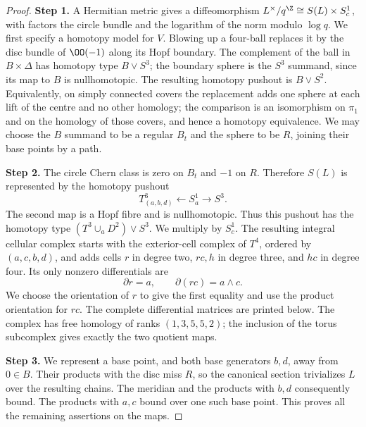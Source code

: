 \begin{proof}
\noindent\textbf{Step 1.} A Hermitian metric gives a diffeomorphism
$L^\times/q^\Z\cong S(L)\times S^1_c$, with factors the circle bundle and
the logarithm of the norm modulo $\log q$. We first specify a homotopy
model for $V$. Blowing up a four-ball replaces it by the disc bundle of
$\OO(-1)$ along its Hopf boundary. The complement of the ball in
$B\times\Delta$ has homotopy type $B\vee S^3$; the boundary sphere is
the $S^3$ summand, since its map to $B$ is nullhomotopic. The resulting
homotopy pushout is $B\vee S^2$. Equivalently, on simply connected
covers the replacement adds one sphere at each lift of the centre and
no other homology; the comparison is an isomorphism on $\pi_1$ and on
the homology of those covers, and hence a homotopy equivalence. We may
choose the $B$ summand to be a regular $B_t$ and the sphere to be $R$,
joining their base points by a path.

\noindent\textbf{Step 2.} The circle Chern class is zero on $B_t$ and $-1$ on $R$. Therefore
$S(L)$ is represented by the homotopy pushout
\[
 T^3_{(a,b,d)}\longleftarrow S^1_a\longrightarrow S^3.
\]
The second map is a Hopf fibre and is nullhomotopic. Thus this pushout
has the homotopy type $(T^3\cup_aD^2)\vee S^3$. We multiply by $S^1_c$.
The resulting integral cellular complex starts with the exterior-cell
complex of $T^4$, ordered by $(a,c,b,d)$, and adds cells $r$ in degree
two, $rc,h$ in degree three, and $hc$ in degree four. Its only nonzero
differentials are
\[
 \partial r=a,\qquad \partial(rc)=a\wedge c.
\]
We choose the orientation of $r$ to give the first equality and use the
product orientation for $rc$. The complete differential matrices are
printed below. The complex has free homology of ranks $(1,3,5,5,2)$;
the inclusion of the torus subcomplex gives exactly the two quotient maps.

\noindent\textbf{Step 3.} We represent a base point, and both base generators $b,d$, away from
$0\in B$. Their products with the disc miss $R$, so the canonical section
trivializes $L$ over the resulting chains. The meridian and the products
with $b,d$ consequently bound. The products with $a,c$ bound over one
such base point. This proves all the remaining assertions on the maps.
\end{proof}

